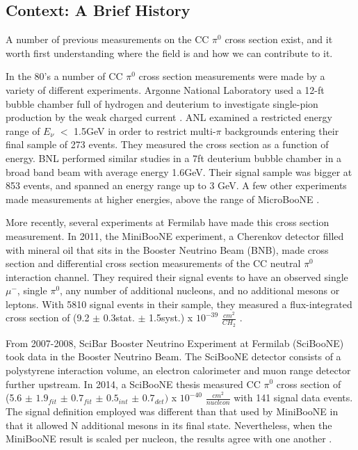 \documentclass[12pt]{article}
\begin{document}
\subsection{Context: A Brief History}
A number of previous measurements on the CC $\pi^0$ cross section exist, and it worth first understanding where the field is and how we can contribute to it.  
\par In the 80's a number of CC $\pi^0$ cross section measurements were made by a variety of different experiments.  Argonne National Laboratory used a 12-ft bubble chamber full of hydrogen and deuterium to investigate single-pion production by the weak charged current \cite{bib:ANL1} \cite{bib:ANL2}. ANL examined a restricted energy range of $E_\nu$ $<$ 1.5GeV in order to restrict multi-$\pi$ backgrounds entering their final sample of 273 events. They measured the cross section as a function of energy. BNL performed similar studies in a 7ft deuterium bubble chamber in a broad band beam with average energy 1.6GeV. Their signal sample was bigger at 853 events, and spanned an energy range up to 3 GeV. A few other experiments made measurements at higher energies, above the range of MicroBooNE \cite{bib:HE_unknown1} \cite{bib:HE_unknown2}.
\par More recently, several experiments at Fermilab have made this cross section measurement. In 2011, the MiniBooNE experiment, a Cherenkov detector filled with mineral oil that sits in the Booster Neutrino Beam (BNB), made cross section and differential cross section measurements of the CC neutral $\pi^0$ interaction channel. They required their signal events to have an observed single $\mu^-$, single $\pi^0$, any number of additional nucleons, and no additional mesons or leptons. With 5810 signal events in their sample, they measured a flux-integrated cross section of (9.2 $\pm$ 0.3stat. $\pm$ 1.5syst.) x $10^{-39}$ $\frac{cm^2}{CH_2}$ \cite{bib:numucc_miniboone} \cite{bib:miniboone_thesis}.  
\par From 2007-2008, SciBar Booster Neutrino Experiment at Fermilab (SciBooNE) took data in the Booster Neutrino Beam. The SciBooNE detector consists of a polystyrene interaction volume, an electron calorimeter and muon range detector further upstream.  In 2014, a SciBooNE thesis measured CC $\pi^0$ cross section of (5.6 $\pm$ $1.9_{fit}$ $\pm$ $0.7_{fit}$ $\pm$ $0.5_{int}$ $\pm$ $0.7_{det})$ x $10^{-40}$ $\frac{cm^2}{nucleon}$ with 141 signal data events. The signal definition employed was different than that used by MiniBooNE in that it allowed N additional mesons in its final state.  Nevertheless, when the MiniBooNE result is scaled per nucleon, the results agree with one another \cite{bib:sciboone_thesis}.
\end{document}
